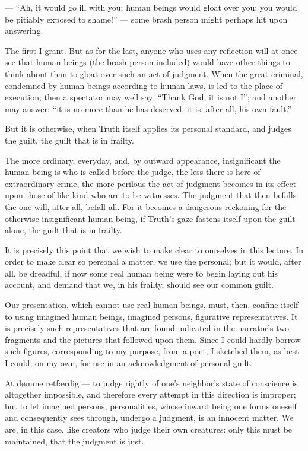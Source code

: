 \documentclass[12pt,a4paper]{book}
\begin{document}
--- ``Ah, it would go ill with you; human beings would gloat over you: you would be pitiably exposed to shame!'' --- some brash person might perhaps hit upon answering.

The first I grant. But as for the last, anyone who uses any reflection will at once see that human beings (the brash person included) would have other things to think about than to gloat over such an act of judgment.
When the great criminal, condemned by human beings according to human laws, is led to the place of execution; then a spectator may well say: ``Thank God, it is not I''; and another may answer: ``it is no more than he has deserved, it is, after all, his own fault.''

But it is otherwise, when Truth itself applies its personal standard, and judges the guilt, the guilt that is in frailty.

The more ordinary, everyday, and, by outward appearance, insignificant the human being is who is called before the judge, the less there is here of extraordinary crime, the more perilous the act of judgment becomes in its effect upon those of like kind who are to be witnesses. The judgment that then befalls the one will, after all, befall all. For it becomes a dangerous reckoning for the otherwise insignificant human being, if Truth's gaze fastens itself upon the guilt alone, the guilt that is in frailty.

It is precisely this point that we wish to make clear to ourselves in this lecture. In order to make clear so personal a matter, we use the personal; but it would, after all, be dreadful, if now some real human being were to begin laying out his account, and demand that we, in his frailty, should see our common guilt.

Our presentation, which cannot use real human beings, must, then, confine itself to using imagined human beings, imagined persons, figurative representatives. It is precisely such representatives that are found indicated in the narrator's two fragments and the pictures that followed upon them. Since I could hardly borrow such figures, corresponding to my purpose, from a poet, I sketched them, as best I could, on my own, for use in an acknowledgment of personal guilt.

At dømme retfærdig --- to judge rightly of one's neighbor's state of conscience is altogether impossible, and therefore every attempt in this direction is improper; but to let imagined persons,
personalities, whose inward being one forms oneself and consequently sees through, undergo a judgment, is an innocent matter. We are, in this case, like creators who judge their own creatures: only this must be maintained, that the judgment is just.
\end{document}

